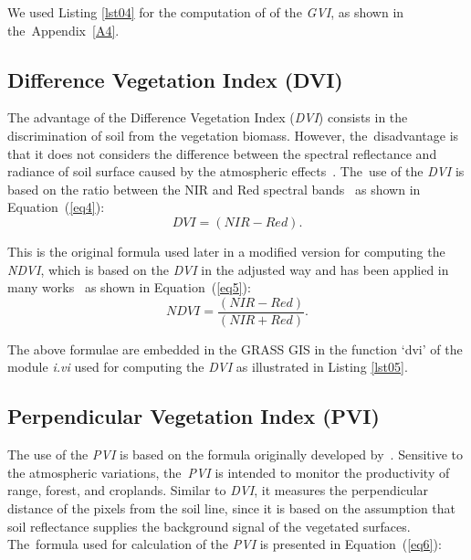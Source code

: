 \documentclass[jmse,article,accept,pdftex,moreauthors]{Definitions/mdpi}
\begin{document}
We used Listing \ref{lst04} for the computation of of the \emph{GVI}, as shown in the~Appendix~\ref{A4}. %

\subsection{Difference Vegetation Index (DVI)}

The advantage of the Difference Vegetation Index (\emph{DVI}) consists in the discrimination of soil from the vegetation biomass. However, the~disadvantage is that it does not considers the difference between the spectral reflectance and radiance of soil surface caused by the atmospheric effects~\cite{TUCKER1979127}. The~use of the \emph{DVI} is based on the ratio between the NIR and Red spectral bands~\cite{Naji2018} as shown in Equation~(\ref{eq4}):
\begin{equation}\label{eq4}
	DVI = (NIR - Red).
\end{equation}

This is the original formula used later in a modified version for computing the \emph{NDVI}, which is based on the \emph{DVI} in the adjusted way and has been applied in many works~\cite{TUCKER1979237,RONDEAUX199695,DATT1998111} as shown in Equation~(\ref{eq5}):
\begin{equation}\label{eq5}
	NDVI = \frac{(NIR - Red)}{(NIR + Red)}.
\end{equation}

The above formulae are embedded in the GRASS GIS in the function `dvi' of the module \emph{i.vi} used for computing the \emph{DVI} as illustrated in Listing \ref{lst05}.

\subsection{Perpendicular Vegetation Index (PVI)}

The use of the \emph{PVI} is based on the formula originally developed by~\cite{Richardson}. Sensitive to the atmospheric variations, the~\emph{PVI} is intended to monitor the productivity of range, forest, and croplands. Similar to \emph{DVI}, it measures the perpendicular distance of the pixels from the soil line, since it is based on the assumption that soil reflectance supplies the background signal of the vegetated surfaces. The~formula used for calculation of the \emph{PVI} is presented in Equation~(\ref{eq6}):
\end{document}
